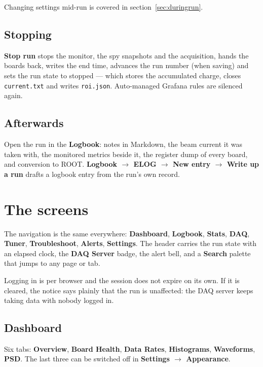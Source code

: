 \documentclass[11pt,a4paper]{report}
\newcommand{\ui}[1]{\textbf{#1}}          %
\newcommand{\file}[1]{\texttt{#1}}
\begin{document}
Changing settings mid-run is covered in section~\ref{sec:duringrun}.

\section{Stopping}

\ui{Stop run} stops the monitor, the spy snapshots and the acquisition, hands the
boards back, writes the end time, advances the run number (when saving) and sets
the run state to stopped --- which stores the accumulated charge, closes
\file{current.txt} and writes \file{roi.json}. Auto-managed Grafana rules are
silenced again.

\section{Afterwards}

Open the run in the \ui{Logbook}: notes in Markdown, the beam current it was taken
with, the monitored metrics beside it, the register dump of every board, and
conversion to ROOT. \ui{Logbook $\rightarrow$ ELOG $\rightarrow$ New entry
$\rightarrow$ Write up a run} drafts a logbook entry from the run's own record.

\chapter{The screens}

The navigation is the same everywhere: \ui{Dashboard}, \ui{Logbook}, \ui{Stats},
\ui{DAQ}, \ui{Tuner}, \ui{Troubleshoot}, \ui{Alerts}, \ui{Settings}. The header
carries the run state with an elapsed clock, the \ui{DAQ Server} badge, the alert
bell, and a \ui{Search} palette that jumps to any page or tab.

Logging in is per browser and the session does not expire on its own. If it is
cleared, the notice says plainly that the run is unaffected: the DAQ server keeps
taking data with nobody logged in.

\section{Dashboard}

Six tabs: \ui{Overview}, \ui{Board Health}, \ui{Data Rates}, \ui{Histograms},
\ui{Waveforms}, \ui{PSD}. The last three can be switched off in
\ui{Settings $\rightarrow$ Appearance}.
\end{document}
